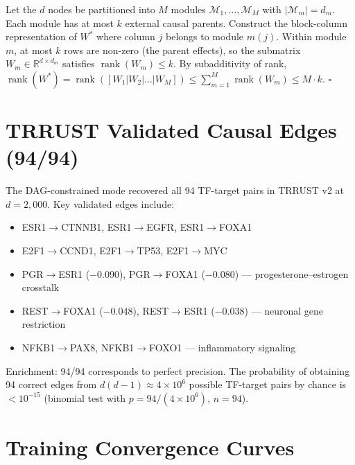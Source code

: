 \documentclass{article}
\DeclareMathOperator{\rank}{rank}
\theoremstyle{definition}
\begin{document}
Let the $d$ nodes be partitioned into $M$ modules $\mathcal{M}_1, \dots, \mathcal{M}_M$ with $|\mathcal{M}_m| = d_m$. Each module has at most $k$ external causal parents. Construct the block-column representation of $W^*$ where column $j$ belongs to module $m(j)$. Within module $m$, at most $k$ rows are non-zero (the parent effects), so the submatrix $W_m \in \mathbb{R}^{d \times d_m}$ satisfies $\rank(W_m) \le k$. By subadditivity of rank, $\rank(W^*) = \rank([W_1 | W_2 | \dots | W_M]) \le \sum_{m=1}^M \rank(W_m) \le M \cdot k$. $\square$

\section{TRRUST Validated Causal Edges (94/94)}
\label{app:trrust}

The DAG-constrained mode recovered all 94 TF-target pairs in TRRUST v2 at $d=2{,}000$. Key validated edges include:

\begin{itemize}
\item ESR1$\rightarrow$CTNNB1, ESR1$\rightarrow$EGFR, ESR1$\rightarrow$FOXA1
\item E2F1$\rightarrow$CCND1, E2F1$\rightarrow$TP53, E2F1$\rightarrow$MYC
\item PGR$\rightarrow$ESR1 ($-$0.090), PGR$\rightarrow$FOXA1 ($-$0.080) --- progesterone--estrogen crosstalk
\item REST$\rightarrow$FOXA1 ($-$0.048), REST$\rightarrow$ESR1 ($-$0.038) --- neuronal gene restriction
\item NFKB1$\rightarrow$PAX8, NFKB1$\rightarrow$FOXO1 --- inflammatory signaling
\end{itemize}

Enrichment: 94/94 corresponds to perfect precision. The probability of obtaining 94 correct edges from $d(d-1) \approx 4 \times 10^6$ possible TF-target pairs by chance is $< 10^{-15}$ (binomial test with $p = 94 / (4 \times 10^6)$, $n = 94$).

\section{Training Convergence Curves}
\label{app:convergence}
\end{document}

